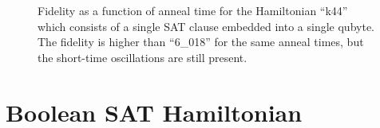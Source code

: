 \begin{figure}
	\caption[Single K44 Fidelity]{Fidelity as a function of anneal time for the Hamiltonian ``k44'' which consists of a single SAT clause embedded into a single qubyte.  The fidelity is higher than ``6\_018'' for the same anneal times, but the short-time oscillations are still present.}
	\label{fig:k44_comparison}
\end{figure}

\section{Boolean SAT Hamiltonian}
